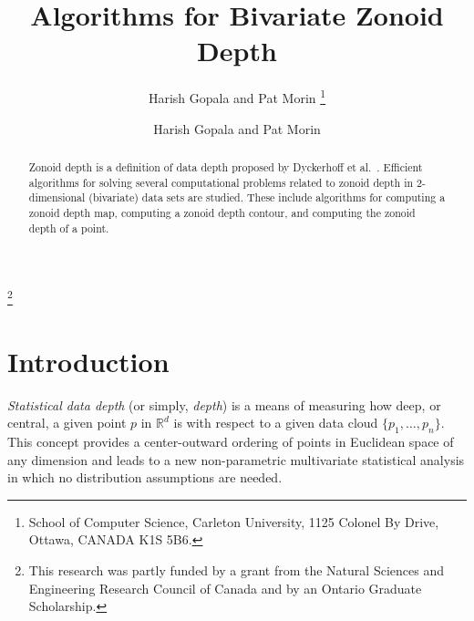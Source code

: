 \documentclass{elsart}
\author{Harish Gopala and Pat Morin%
	\thanks{School of Computer Science,
		Carleton University, 
		1125 Colonel By Drive, 
		Ottawa, CANADA K1S 5B6.
   		\email{\{hgopala,morin\}@scs.carleton.ca}
	}
}
\date{}
\begin{document}
\begin{frontmatter}
\title{Algorithms for Bivariate Zonoid Depth}
\author{Harish Gopala and Pat Morin}
\address{School of Computer Science, Carleton University \\
	1125 Colonel By Drive, Ottawa, CANADA K1S~5B6}

\thanks[funding]{This research was partly funded by a grant from the
Natural Sciences and Engineering Research Council of Canada and by an
Ontario Graduate Scholarship.}

\begin{abstract}
Zonoid depth is a definition of data depth proposed by Dyckerhoff et
al.\ \cite{zonoid_data_depth_theory_and_computation}. 
Efficient algorithms for solving several computational problems
related to zonoid depth
in 2-dimensional (bivariate) data sets are studied. These include algorithms
for computing a zonoid depth map, computing a zonoid depth contour,
and computing the zonoid depth of a point.
\end{abstract}
\end{frontmatter}

\section{Introduction}\label{section_introduction}

\emph{Statistical data depth} (or simply, \emph{depth}) is a means of
measuring how deep, or central, a given point $p$ in $\mathbb{R}^d$ is
with respect to a given data cloud $\{p_1, \ldots, p_n\}$. This
concept provides a center-outward ordering of points in Euclidean
space of any dimension and leads to a new non-parametric multivariate
statistical analysis in which no distribution assumptions are needed.
\end{document}
